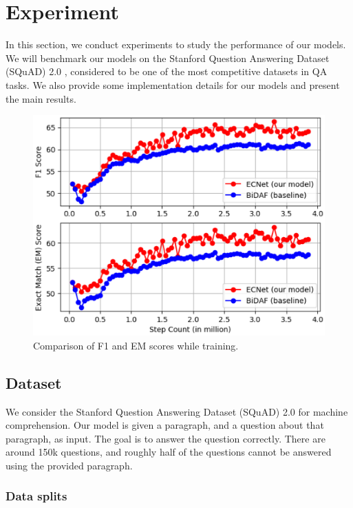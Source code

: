 \section{Experiment}
\label{sec:experiment}

In this section, we conduct experiments to study the performance of our models. We will benchmark our models on the Stanford Question Answering Dataset (SQuAD) 2.0 \cite{rajpurkar2018know}, considered to be one of the most competitive datasets in QA tasks. We also provide some implementation details for our models and present the main results.

\begin{figure}[h!]
\centering
	\includegraphics[width=12cm]{Figs4Paper/F1EM2.eps}
  \caption{Comparison of F1 and EM scores while training.}
  \label{fig:f1em}
\end{figure}



\subsection{Dataset}
\label{subsec:dataset}

We consider the Stanford Question Answering Dataset (SQuAD) 2.0 \cite{rajpurkar2018know} for machine comprehension. Our model is given a paragraph, and a question about that paragraph, as input. The goal is to answer the question correctly. There are around 150k questions, and roughly half of the questions cannot be answered using the provided paragraph. 


\subsubsection{Data splits}
\label{subsubsec:dataset}


